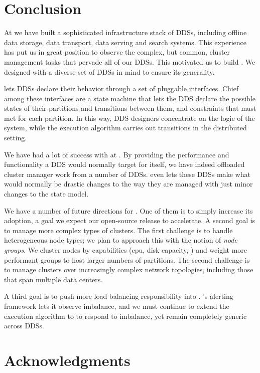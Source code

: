 \section{Conclusion}
\label{sec:conclusion}
%
At \linkedin we have built a sophisticated infrastructure stack of DDSs, including
offline data storage, data transport, data serving and search systems.  This
experience has put us in great position to observe the complex, but common,
cluster management tasks that pervade all of our DDSs.  This motivated us to
build \helix.  We designed \helix with a diverse set of DDSs in mind to ensure
its generality.

\helix lets DDSs declare their behavior through a set of pluggable interfaces.
Chief among these interfaces are a state machine that lets the DDS declare the
possible states of their partitions and transitions between them, and constraints 
that must met for each partition.  In this way, DDS designers concentrate on
the logic of the system, while the \helix execution algorithm carries out transitions in the distributed
setting.  

We have had a lot of success with \helix at \linkedin.  By providing the
performance and functionality a DDS would normally target for itself, we have indeed
offloaded cluster manager work from a number of DDSs.  \helix even lets these DDSs
make what would normally be drastic changes to the way they are managed with
just minor changes to the \helix state model.    

We have a number of future directions for \helix.  One of them is to simply
increase its adoption, a goal we expect our open-source release to accelerate.
A second goal is to manage more complex types of clusters.  The first challenge
is to handle heterogeneous node types; we plan to approach this with the notion
of \emph{node groups}.  We cluster nodes by capabilities (cpu, disk capacity,
\etc) and weight more performant groups to host larger numbers of partitions. 
The second challenge is to manage clusters over increasingly complex network
topologies, including those that span multiple data centers.  

A third goal is to push more load balancing responsibility into \helix.  \helix's
alerting framework lets it observe imbalance, and we must continue to extend the
\helix execution algorithm to to respond to imbalance, yet remain completely
generic across DDSs. 

\section{Acknowledgments}
\label{sec:Acknowledgements}


